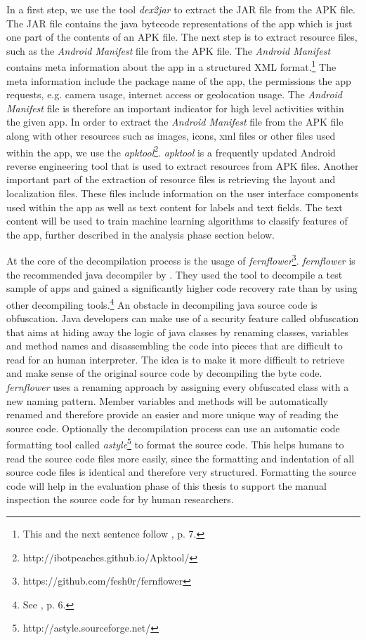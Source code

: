 In a first step, we use the tool \textit{dex2jar} to extract the \acs{JAR} file from the APK file.
The JAR file contains the java bytecode representations of the app which is just one part of the contents of an \acs{APK} file.
The next step is to extract resource files, such as the \textit{Android Manifest} file from the APK file.
The \textit{Android Manifest} contains meta information about the app in a structured XML format.\footnote{This and the next sentence follow \cite{xu2013}, p. 7.}
The meta information include the package name of the app, the permissions the app requests, e.g. camera usage, internet access or geolocation usage.
The \textit{Android Manifest} file is therefore an important indicator for high level activities within the given app.
In order to extract the \textit{Android Manifest} file from the APK file along with other resources such as images, icons, xml files or other files used within the app, we use the \textit{apktool}\footnote{http://ibotpeaches.github.io/Apktool/}.
\textit{apktool} is a frequently updated Android reverse engineering tool that is used to extract resources from APK files.
Another important part of the extraction of resource files is retrieving the layout and localization files.
These files include information on the user interface components used within the app as well as text content for labels and text fields.
The text content will be used to train machine learning algorithms to classify features of the app, further described in the analysis phase section below.

At the core of the decompilation process is the usage of \textit{fernflower}\footnote{https://github.com/fesh0r/fernflower}.
\textit{fernflower} is the recommended java decompiler by \cite{Enck2011}. 
They used the tool to decompile a test sample of apps and gained a significantly higher code recovery rate than by using other decompiling tools.\footnote{See \cite{Enck2011}, p. 6.}
An obstacle in decompiling java source code is obfuscation. 
Java developers can make use of a security feature called obfuscation that aims at hiding away the logic of java classes by renaming classes, variables and method names and disassembling the code into pieces that are difficult to read for an human interpreter.
The idea is to make it more difficult to retrieve and make sense of the original source code by decompiling the byte code.
\textit{fernflower} uses a renaming approach by assigning every obfuscated class with a new naming pattern. 
Member variables and methods will be automatically renamed and therefore provide an easier and more unique way of reading the source code.
Optionally the decompilation process can use an automatic code formatting tool called \textit{astyle}\footnote{http://astyle.sourceforge.net/} to format the source code.
This helps humans to read the source code files more easily, since the formatting and indentation of all source code files is identical and therefore very structured.
Formatting the source code will help in the evaluation phase of this thesis to support the manual inspection the source code for \ipr by human researchers.


